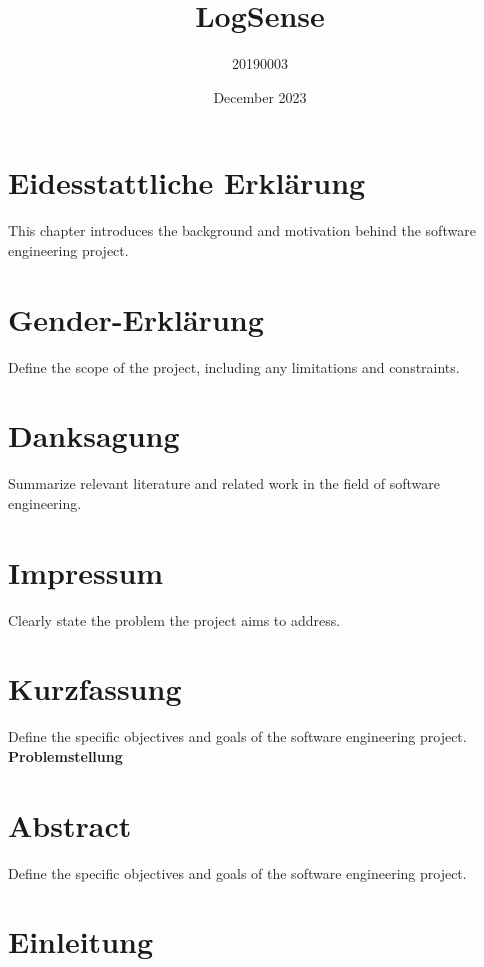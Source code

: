 \documentclass[pdftex,11pt,a4paper,oneside]{book}
\title{LogSense}
\author{20190003}
\date{December 2023}
\begin{document}
\maketitle

 {
    \fancyhead{}
    \fancyfoot{}
    \renewcommand{\headrulewidth}{0pt}
}

\chapter{Eidesstattliche Erklärung}
This chapter introduces the background and motivation behind the software engineering project.

\chapter{Gender-Erklärung}
Define the scope of the project, including any limitations and constraints.

\chapter{Danksagung}
Summarize relevant literature and related work in the field of software engineering.

\chapter{Impressum}
Clearly state the problem the project aims to address.

\chapter{Kurzfassung}
Define the specific objectives and goals of the software engineering project.
\textbf{Problemstellung} 

\chapter{Abstract}
Define the specific objectives and goals of the software engineering project.

\tableofcontents

\chapter{Einleitung}
\end{document}
